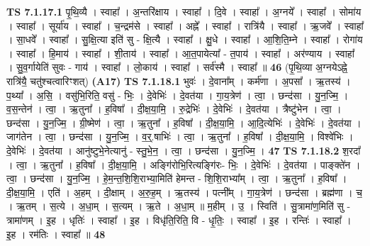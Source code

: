 \documentclass[17pt]{extarticle}
\begin{document}
                                \textbf{ TS 7.1.17.1} \newline
                  पृ॒थि॒व्यै । स्वाहा᳚ । अ॒न्तरि॑क्षाय । स्वाहा᳚ । दि॒वे । स्वाहा᳚ । अ॒ग्नये᳚ । स्वाहा᳚ । सोमा॑य । स्वाहा᳚ । सूर्या॑य । स्वाहा᳚ । च॒न्द्रम॑से । स्वाहा᳚ । अह्ने᳚ । स्वाहा᳚ । रात्रि॑यै । स्वाहा᳚ । ऋ॒जवे᳚ । स्वाहा᳚ । सा॒धवे᳚ । स्वाहा᳚ । सु॒क्षि॒त्या इति॑ सु - क्षि॒त्यै । स्वाहा᳚ । क्षु॒धे । स्वाहा᳚ । आ॒शि॒ति॒म्ने । स्वाहा᳚ । रोगा॑य । स्वाहा᳚ । हि॒माय॑ । स्वाहा᳚ । शी॒ताय॑ । स्वाहा᳚ । आ॒त॒पायेत्या᳚ - त॒पाय॑ । स्वाहा᳚ । अर॑ण्याय । स्वाहा᳚ । सु॒व॒र्गायेति॑ सुवः - गाय॑ । स्वाहा᳚ । लो॒काय॑ । स्वाहा᳚ । सर्व॑स्मै । स्वाहा᳚ ॥ \textbf{  46} \newline
                  \newline
                      (पृ॒थि॒व्या अ॒ग्नयेऽह्ने॒ रात्रि॑यै॒ चतु॑श्चत्वारिꣳशत्)  \textbf{(A17)} \newline \newline
                                \textbf{ TS 7.1.18.1} \newline
                  भुवः॑ । दे॒वाना᳚म् । कर्म॑णा । अ॒पसा᳚ । ऋ॒तस्य॑ । प॒थ्या᳚ । अ॒सि॒ । वसु॑भि॒रिति॒ वसु॑ - भिः॒ । दे॒वेभिः॑ । दे॒वत॑या । गा॒य॒त्रेण॑ । त्वा॒ । छन्द॑सा । यु॒न॒ज्मि॒ । व॒स॒न्तेन॑ । त्वा॒ । ऋ॒तुना᳚ । ह॒विषा᳚ । दी॒क्ष॒या॒मि॒ । रु॒द्रेभिः॑ । दे॒वेभिः॑ । दे॒वत॑या । त्रैष्टु॑भेन । त्वा॒ । छन्द॑सा । यु॒न॒ज्मि॒ । ग्री॒ष्मेण॑ । त्वा॒ । ऋ॒तुना᳚ । ह॒विषा᳚ । दी॒क्ष॒या॒मि॒ । आ॒दि॒त्येभिः॑ । दे॒वेभिः॑ । दे॒वत॑या । जाग॑तेन । त्वा॒ । छन्द॑सा । यु॒न॒ज्मि॒ । व॒र्॒.षाभिः॑ । त्वा॒ । ऋ॒तुना᳚ । ह॒विषा᳚ । दी॒क्ष॒या॒मि॒ । विश्वे॑भिः । दे॒वेभिः॑ । दे॒वत॑या । आनु॑ष्टुभे॒नेत्यानु॑ - स्तु॒भे॒न॒ । त्वा॒ । छन्द॑सा । यु॒न॒ज्मि॒ । \textbf{  47} \newline
                  \newline
                                \textbf{ TS 7.1.18.2} \newline
                  श॒रदा᳚ । त्वा॒ । ऋ॒तुना᳚ । ह॒विषा᳚ । दी॒क्ष॒या॒मि॒ । अङ्गि॑रोभि॒रित्यङ्गि॑रः- भिः॒ । दे॒वेभिः॑ । दे॒वत॑या । पाङ्क्ते॑न । त्वा॒ । छन्द॑सा । यु॒न॒ज्मि॒ । हे॒म॒न्त॒शि॒शि॒राभ्या॒मिति॑ हेमन्त - शि॒शि॒राभ्या᳚म् । त्वा॒ । ऋ॒तुना᳚ । ह॒विषा᳚ । दी॒क्ष॒या॒मि॒ । एति॑ । अ॒हम् । दी॒क्षाम् । अ॒रु॒ह॒म् । ऋ॒तस्य॑ । पत्नी᳚म् । गा॒य॒त्रेण॑ । छन्द॑सा । ब्रह्म॑णा । च॒ । ऋ॒तम् । स॒त्ये । अ॒धा॒म् । स॒त्यम् । ऋ॒ते । अ॒धा॒म् ॥ म॒हीम् । उ॒ । स्विति॑ । सु॒त्रामा॑ण॒मिति॑ सु - त्रामा॑णम् । इ॒ह । धृतिः॑ । स्वाहा᳚ । इ॒ह । विधृ॑ति॒रिति॒ वि - धृ॒तिः॒ । स्वाहा᳚ । इ॒ह । रन्तिः॑ । स्वाहा᳚ । इ॒ह । रम॑तिः । स्वाहा᳚ ॥ \textbf{  48} \newline
                  \newline
\end{document}
